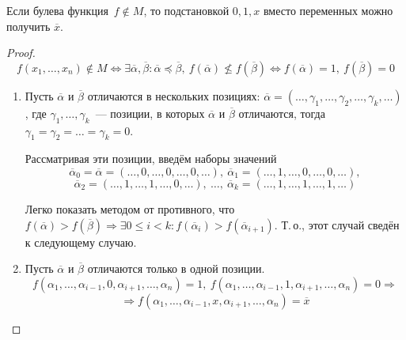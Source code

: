 \begin{lemma}
Если булева функция~$f \notin M$, то подстановкой $0, 1, x$ вместо переменных можно получить $\overline x$.
\end{lemma}
\begin{proof}
\begin{equation*}
f(x_1, \ldots, x_n) \notin M \Leftrightarrow
\exists \overline\alpha, \overline\beta \colon
\overline\alpha \preccurlyeq \overline\beta, \ f(\overline\alpha) \nleqslant f(\overline\beta) \Leftrightarrow
f(\overline\alpha) = 1, \ f(\overline\beta) = 0
\end{equation*}
\begin{enumerate}
	\item Пусть $\overline\alpha$ и $\overline\beta$ отличаются в нескольких позициях:
	$\overline\alpha = (\ldots, \gamma_1, \ldots, \gamma_2, \ldots, \gamma_k, \ldots)$, где
	$\gamma_1, \ldots, \gamma_k$~--- позиции, в которых $\overline\alpha$ и $\overline\beta$ отличаются, тогда $\gamma_1 = \gamma_2 = \ldots = \gamma_k = 0$.
	
	Рассматривая эти позиции, введём наборы значений
	\begin{equation*}
	\overline\alpha_0 = \overline\alpha = (\ldots, 0, \ldots, 0, \ldots, 0, \ldots), \
	\overline\alpha_1 = (\ldots, 1, \ldots, 0, \ldots, 0, \ldots),
	\end{equation*}
	\begin{equation*}
	\overline\alpha_2 = (\ldots, 1, \ldots, 1, \ldots, 0, \ldots), \ \ldots, \
	\overline\alpha_k = (\ldots, 1, \ldots, 1, \ldots, 1, \ldots)
	\end{equation*}
	
	Легко показать методом от противного, что $f(\overline\alpha) > f(\overline\beta) \Rightarrow
	\exists 0 \leqslant i < k \colon f(\overline\alpha_i) > f(\overline\alpha_{i+1})$.
	Т.\,о., этот случай сведён к следующему случаю.
	
	\item Пусть $\overline\alpha$ и $\overline\beta$ отличаются только в одной позиции.
	\begin{equation*}
	f(\alpha_1, \ldots, \alpha_{i-1}, 0, \alpha_{i+1}, \ldots, \alpha_n) = 1, \
	f(\alpha_1, \ldots, \alpha_{i-1}, 1, \alpha_{i+1}, \ldots, \alpha_n) = 0 \Rightarrow
	\end{equation*}
	\begin{equation*}
	\Rightarrow f(\alpha_1, \ldots, \alpha_{i-1}, x, \alpha_{i+1}, \ldots, \alpha_n) = \overline x
	\end{equation*}
\end{enumerate}
\end{proof}

